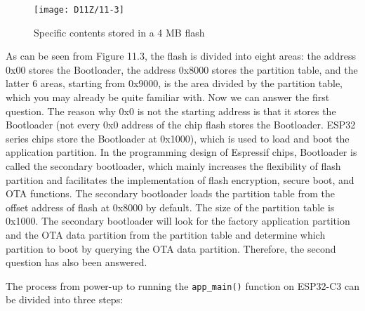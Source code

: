 \documentclass[a4paper,12pt]{book}
\begin{document}
\begin{figure}[!h]
    \centering
    \texttt{[image: D11Z/11-3]}
    \caption{Specific contents stored in a 4 MB flash}
\end{figure}

As can be seen from Figure 11.3, the flash is divided into eight areas: the address 0x00 stores the Bootloader, the address 0x8000 stores the partition table, and the latter 6 areas, starting from 0x9000, is the area divided by the partition table, which you may already be quite familiar with. Now we can answer the first question. The reason why 0x0 is not the starting address is that it stores the Bootloader (not every 0x0 address of the chip flash stores the Bootloader. ESP32 series chips store the Bootloader at 0x1000), which is used to load and boot the application partition. In the programming design of Espressif chips, Bootloader is called the secondary bootloader, which mainly increases the flexibility of flash partition and facilitates the implementation of flash encryption, secure boot, and OTA functions. The secondary bootloader loads the partition table from the offset address of flash at 0x8000 by default. The size of the partition table is 0x1000. The secondary bootloader will look for the factory application partition and the OTA data partition from the partition table and determine which partition to boot by querying the OTA data partition. Therefore, the second question has also been answered.

The process from power-up to running the \verb|app_main()| function on ESP32-C3 can be divided into three steps:
\end{document}
